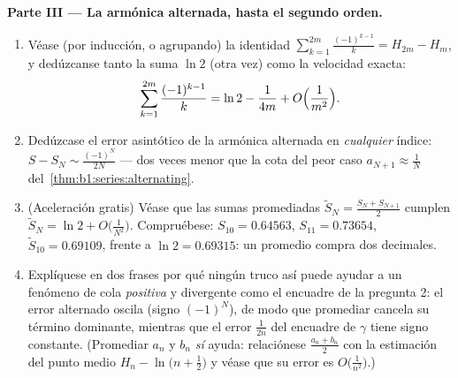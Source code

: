 \begin{problem}[{Problema del fin de semana --- $H_n = \ln n + \gamma +
\frac{1}{2n} + O(n^{-2})$, y la reordenación de
$1 - \frac12 + \frac13 - \dots$ hasta $\frac{\ln 2}{2}$}]
\medskip
\noindent\textbf{Parte III --- La  armónica alternada, hasta el
segundo orden.}
\begin{enumerate}[resume]
  \item Véase (por inducción, o agrupando) la identidad
        $\sum_{k=1}^{2m} \frac{(-1)^{k-1}}{k} = H_{2m} - H_m$, y
        dedúzcanse tanto la suma $\ln 2$ (otra vez) como la
        velocidad exacta:
        \[
        \sum_{k=1}^{2m} \frac{(-1)^{k-1}}{k}
        = \ln 2 - \frac{1}{4m} + O\Bigl(\frac{1}{m^2}\Bigr) .
        \]
  \item Dedúzcase el error asintótico de la  armónica alternada
        en \emph{cualquier} índice: $S - S_N \sim
        \frac{(-1)^N}{2N}$ --- dos veces menor que la cota del peor
        caso $a_{N+1} \approx \frac1N$
        del~\cref{thm:b1:series:alternating}.
  \item (Aceleración gratis) Véase que las sumas promediadas
        $\tilde S_N = \frac{S_N + S_{N+1}}{2}$ cumplen
        $\tilde S_N = \ln 2 + O\bigl(\frac{1}{N^2}\bigr)$.
        Compruébese: $S_{10} = 0.64563$, $S_{11} = 0.73654$,
        $\tilde S_{10} = 0.69109$, frente a $\ln 2 = 0.69315$: un
        promedio compra dos decimales.
  \item Explíquese en dos frases por qué ningún truco así puede
        ayudar a un fenómeno de cola \emph{positiva} y divergente
        como el encuadre de la pregunta 2: el error alternado
        oscila (signo $(-1)^N$), de modo que promediar cancela su
        término dominante, mientras que el error
        $\frac{1}{2n}$ del encuadre de $\gamma$ tiene signo
        constante. (Promediar $a_n$ y $b_n$ \emph{sí} ayuda:
        relaciónese $\frac{a_n + b_n}{2}$ con la estimación del
        punto medio $H_n - \ln\bigl(n + \frac12\bigr)$ y véase que
        su error es $O\bigl(\frac{1}{n^2}\bigr)$.)
\end{enumerate}


\end{problem}
